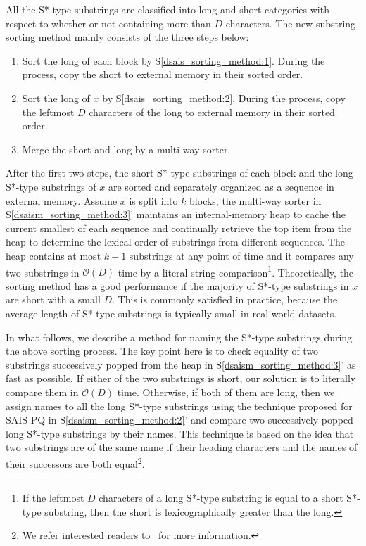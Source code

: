 \documentclass[10pt,journal,compsoc]{IEEEtran}
\begin{document}
All the S*-type substrings are classified into long and short categories with respect to whether or not containing more than $D$ characters. The new substring sorting method mainly consists of the three steps below:

\begin{enumerate}[S1']
	\item Sort the long of each block by S\ref{dsais_sorting_method:1}. During the process, copy the short to external memory in their sorted order.~\label{dsaism_sorting_method:1}
	
	\item Sort the long of $x$ by S\ref{dsais_sorting_method:2}. During the process, copy the leftmost $D$ characters of the long to external memory in their sorted order.~\label{dsaism_sorting_method:2}
	
	\item Merge the short and long by a multi-way sorter.~\label{dsaism_sorting_method:3}
\end{enumerate}

After the first two steps, the short S*-type substrings of each block and the long S*-type substrings of $x$ are sorted and separately organized as a sequence in external memory. Assume $x$ is split into $k$ blocks, the multi-way sorter in S\ref{dsaism_sorting_method:3}' maintains an internal-memory heap to cache the current smallest of each sequence and continually retrieve the top item from the heap to determine the lexical order of substrings from different sequences. The heap contains at most $k + 1$ substrings at any point of time and it compares any two substrings in $\mathcal{O}(D)$ time by a literal string comparison\footnote{If the leftmost $D$ characters of a long S*-type substring is equal to a short S*-type substring, then the short is lexicographically greater than the long.}. Theoretically, the sorting method has a good performance if the majority of S*-type substrings in $x$ are short with a small $D$. This is commonly satisfied in practice, because the average length of S*-type substrings is typically small in real-world datasets.

In what follows, we describe a method for naming the S*-type substrings during the above sorting process. The key point here is to check equality of two substrings successively popped from the heap in S\ref{dsaism_sorting_method:3}' as fast as possible. If either of the two substrings is short, our solution is to literally compare them in $\mathcal{O}(D)$ time. Otherwise, if both of them are long, then we assign names to all the long S*-type substrings using the technique proposed for SAIS-PQ in S\ref{dsaism_sorting_method:2}' and compare two successively popped long S*-type substrings by their names. This technique is based on the idea that two substrings are of the same name if their heading characters and the names of their successors are both equal\footnote{We refer interested readers to~\cite{Liu15} for more information.}.
\end{document}
